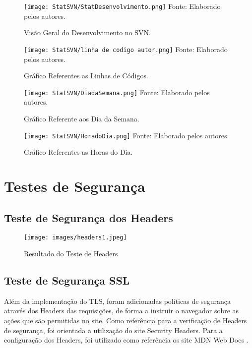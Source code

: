 \documentclass[
    12pt,               %
    openright,          %
    oneside,
    a4paper,            %
    BIBLATEX,           %
    TODO,               %
    english,            %
    brazil              %
    ]{ifsp-spo-inf-ctds}
\begin{document}
    \begin{figure}[H]
                \centering
                \caption{Visão Geral do Desenvolvimento no SVN.}
                \texttt{[image: StatSVN/StatDesenvolvimento.png]}
                {\footnotesize Fonte: Elaborado pelos autores.}
                \label{fig:desenvolvimentoSVN}
            \end{figure}

    \begin{figure}[H]
                \centering
                \caption{Gráfico Referentes as Linhas de Códigos.}
                \texttt{[image: StatSVN/linha de codigo autor.png]}
                {\footnotesize Fonte: Elaborado pelos autores.}
                \label{fig:linhaCod}
            \end{figure}

    \begin{figure}[H]
                \centering
                \caption{Gráfico Referente aos Dia da Semana.}
                \texttt{[image: StatSVN/DiadaSemana.png]}
                {\footnotesize Fonte: Elaborado pelos autores.}
                \label{fig:diaSemana}
            \end{figure} 

    \begin{figure}[H]
                \centering
                \caption{Gráfico Referentes as Horas do Dia.}
                \texttt{[image: StatSVN/HoradoDia.png]}
                {\footnotesize Fonte: Elaborado pelos autores.}
                \label{fig:horaDia}
            \end{figure} 

\section{Testes de Segurança}

    \subsection{Teste de Segurança dos Headers}

    \begin{figure}[H]
        \centering
        \texttt{[image: images/headers1.jpeg]}    \caption{Resultado do Teste de Headers}
        \label{fig:header}
    \end{figure}

    \subsection{Teste de Segurança SSL}
        Além da implementação do TLS, foram adicionadas políticas de segurança através dos Headers das requisições, de forma a instruir o navegador sobre as ações que são permitidas no site.
        Como referência para a verificação de Headers de segurança, foi orientada a utilização do site Security Headers.
        Para a configuração dos Headers, foi utilizado como referência os site MDN Web Docs .
\end{document}
